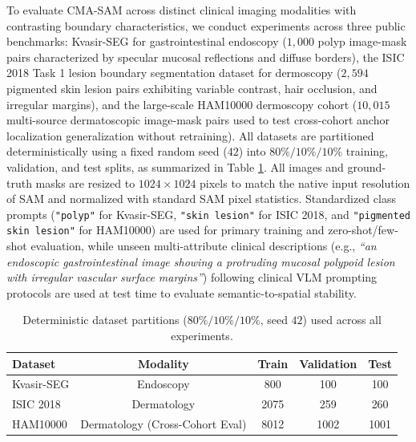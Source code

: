 \documentclass[onecolumn]{IEEEtran}
\numberwithin{equation}{section}
\theoremstyle{definition}
\theoremstyle{remark}
\begin{document}
To evaluate CMA-SAM across distinct clinical imaging modalities with contrasting boundary characteristics, we conduct experiments across three public benchmarks: Kvasir-SEG \cite{jha2020kvasir} for gastrointestinal endoscopy ($1{,}000$ polyp image-mask pairs characterized by specular mucosal reflections and diffuse borders), the ISIC 2018 Task 1 lesion boundary segmentation dataset \cite{codella2018skin} for dermoscopy ($2{,}594$ pigmented skin lesion pairs exhibiting variable contrast, hair occlusion, and irregular margins), and the large-scale HAM10000 dermoscopy cohort \cite{tschandl2018ham10000} ($10{,}015$ multi-source dermatoscopic image-mask pairs used to test cross-cohort anchor localization generalization without retraining). All datasets are partitioned deterministically using a fixed random seed ($42$) into $80\% / 10\% / 10\%$ training, validation, and test splits, as summarized in Table \ref{tab:dataset_splits}. All images and ground-truth masks are resized to $1024 \times 1024$ pixels to match the native input resolution of SAM \cite{kirillov2023segment} and normalized with standard SAM pixel statistics. Standardized class prompts (\texttt{"polyp"} for Kvasir-SEG, \texttt{"skin lesion"} for ISIC 2018, and \texttt{"pigmented skin lesion"} for HAM10000) are used for primary training and zero-shot/few-shot evaluation, while unseen multi-attribute clinical descriptions (e.g., \textit{``an endoscopic gastrointestinal image showing a protruding mucosal polypoid lesion with irregular vascular surface margins''}) following clinical VLM prompting protocols \cite{sellergren2025medgemma} are used at test time to evaluate semantic-to-spatial stability.

\begin{table}[!htbp]
\centering
\caption{Deterministic dataset partitions ($80\%/10\%/10\%$, seed $42$) used across all experiments.}
\label{tab:dataset_splits}
\begin{tabular}{lcccc}
\toprule
\textbf{Dataset} & \textbf{Modality} & \textbf{Train} & \textbf{Validation} & \textbf{Test} \\
\midrule
Kvasir-SEG \cite{jha2020kvasir} & Endoscopy & 800 & 100 & 100 \\
ISIC 2018 \cite{codella2018skin} & Dermatology & 2075 & 259 & 260 \\
HAM10000 \cite{tschandl2018ham10000} & Dermatology (Cross-Cohort Eval) & 8012 & 1002 & 1001 \\
\bottomrule
\end{tabular}
\end{table}
\end{document}
